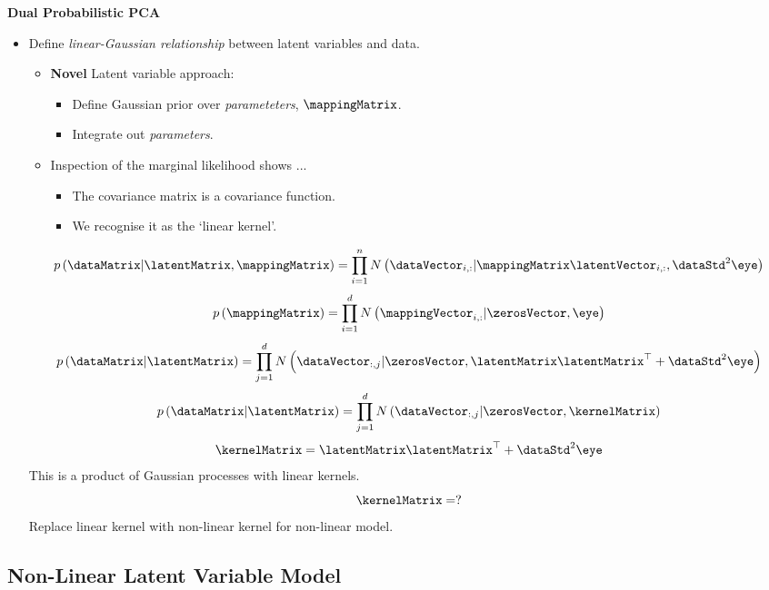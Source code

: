 \textbf{Dual Probabilistic PCA}
\begin{itemize}
\item Define \emph{linear-Gaussian relationship} between latent variables
and data.

\begin{itemize}
\item \textbf{Novel} Latent variable approach:

\begin{itemize}
\item Define Gaussian prior over \emph{parameteters}, $\mappingMatrix$.
\item Integrate out \emph{parameters}.
\end{itemize}
\item Inspection of the marginal likelihood shows ...

\begin{itemize}
\item The covariance matrix is a covariance function.
\item We recognise it as the `linear kernel'.
\end{itemize}
\end{itemize}
\begin{center}
\[
p\left(\dataMatrix|\latentMatrix,\mappingMatrix\right)=\prod_{i=1}^{n}N\left(\dataVector_{i,:}|\mappingMatrix\latentVector_{i,:},\dataStd^{2}\eye\right)\]
\[
p\left(\mappingMatrix\right)=\prod_{i=1}^{d}N\left(\mappingVector_{i,:}|\zerosVector,\eye\right)\]
\[
p\left(\dataMatrix|\latentMatrix\right)=\prod_{j=1}^{d}N\left(\dataVector_{:,j}|\zerosVector,\latentMatrix\latentMatrix^{\top}+\dataStd^{2}\eye\right)\]
\[
p\left(\dataMatrix|\latentMatrix\right)=\prod_{j=1}^{d}N\left(\dataVector_{:,j}|\zerosVector,\kernelMatrix\right)\]
\[
\kernelMatrix=\latentMatrix\latentMatrix^{\top}+\dataStd^{2}\eye\]
This is a product of Gaussian processes with linear kernels.\[
\kernelMatrix=?\]
Replace linear kernel with non-linear kernel for non-linear model.
\par\end{center}

\end{itemize}
\subsection{Non-Linear Latent Variable Model}

